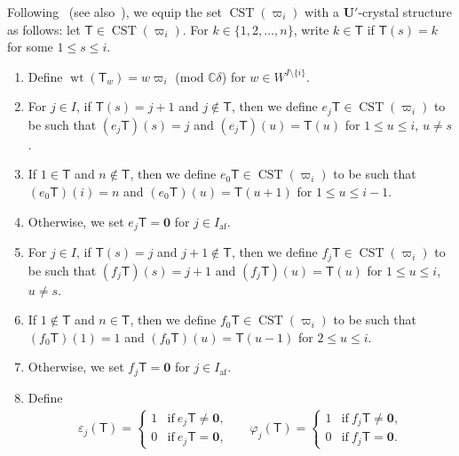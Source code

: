 \documentclass[10pt]{amsart}
\theoremstyle{definition}\newtheorem{defi}[theo]{Definition}
\theoremstyle{remark}\newtheorem{rema}[theo]{Remark}
\newcommand{\BC}{\mathbb{C}}
\newcommand\bm[1]{\boldsymbol{#1}}
\newcommand{\U}{\mathbf{U}}
\DeclareMathOperator{\af}{af}
\DeclareMathOperator{\wt}{wt}
\DeclareMathOperator{\CST}{CST}
\begin{document}
Following~\cite[\S~3.7]{S} (see also~\cite[\S~4.1]{KMN}), we equip the set 
$\CST (\varpi_i)$
with a $\U'$-crystal structure as follows: 
let 
$\mathsf{T} \in \CST (\varpi_i)$. 
For 
$k \in \{ 1,2,\ldots ,n \}$, 
write 
$k \in \mathsf{T}$ 
if 
$\mathsf{T}(s) = k$
for some 
$1 \leq s \leq i$.
\begin{enumerate}[label=(\roman*)]
\item
Define 
$\wt (\mathsf{T}_w) = w\varpi_i$ (mod $\BC \delta$) 
for 
$w \in W^{I \setminus \{ i \}}$. 
\item
For $j \in I$, 
if 
$\mathsf{T}(s) = j+1$ 
and 
$j \notin \mathsf{T}$, 
then we define 
$e_j \mathsf{T} \in \CST (\varpi_i)$ 
to be such that 
$(e_j \mathsf{T})(s) = j$ 
and 
$(e_j \mathsf{T})(u) = \mathsf{T}(u)$ 
for 
$1 \leq u \leq i$, $u \neq s$. 
\item
If 
$1 \in \mathsf{T}$
and 
$n \notin \mathsf{T}$, 
then we define 
$e_0 \mathsf{T} \in \CST (\varpi_i)$ 
to be such that 
$(e_0 \mathsf{T})(i) = n$ 
and 
$(e_0 \mathsf{T})(u) = \mathsf{T}(u+1)$ 
for 
$1 \leq u \leq i-1$.
\item
Otherwise, we set 
$e_j \mathsf{T} = \bm{0}$
for $j \in I_{\af}$.
\item
For $j \in I$, 
if
$\mathsf{T}(s) = j$ 
and 
$j+1 \notin \mathsf{T}$, 
then we define 
$f_j \mathsf{T} \in \CST (\varpi_i)$ 
to be such that 
$(f_j \mathsf{T})(s) = j+1$ 
and 
$(f_j \mathsf{T})(u) = \mathsf{T}(u)$ 
for 
$1 \leq u \leq i$, $u \neq s$. 
\item
If 
$1 \notin \mathsf{T}$ 
and 
$n \in \mathsf{T}$, 
then we define 
$f_0 \mathsf{T} \in \CST (\varpi_i)$ 
to be such that 
$(f_0 \mathsf{T})(1) = 1$ 
and 
$(f_0 \mathsf{T})(u) = \mathsf{T}(u-1)$ 
for 
$2 \leq u \leq i$.
\item
Otherwise, we set 
$f_j \mathsf{T} = \bm{0}$
for $j \in I_{\af}$. 
\item
Define
\begin{align} \label{eq:CST}
\varepsilon_j(\mathsf{T}) 
=
\begin{cases}
1 & \text{if} \ e_j \mathsf{T} \neq \bm{0}, \\%
0 & \text{if} \ e_j \mathsf{T} = \bm{0},
\end{cases}
&&
\varphi_j(\mathsf{T}) 
=
\begin{cases}
1 & \text{if} \ f_j \mathsf{T} \neq \bm{0}, \\%
0 & \text{if} \ f_j \mathsf{T} = \bm{0}.
\end{cases}
\end{align}
\end{enumerate}
\end{document}
